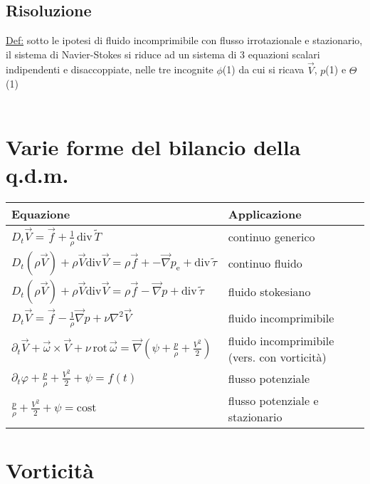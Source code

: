 \documentclass[11pt,a4paper]{report}
\begin{document}
	\section{Risoluzione}
	\underline{Def:} sotto le ipotesi di fluido incomprimibile con flusso irrotazionale e stazionario, il sistema di Navier-Stokes si riduce ad un sistema di 3 equazioni scalari indipendenti e disaccoppiate, nelle tre incognite $\phi$(1) da cui si ricava $\vec V$, $p$(1) e $\Theta$(1)\\\mbox{}\\

{\let\clearpage\relax \chapter{Varie forme del bilancio della q.d.m.}
	\begin{tabular}{@{}l|l}
	\quad Equazione&\quad Applicazione\\
	\hline
	$D_t\vec V=\vec f+\frac 1\rho\,\mathrm{div}\,\utilde T$&continuo generico\\
	$D_t(\rho\vec V)+\rho\vec V\mathrm{div}\vec V=\rho\vec f+-\vec\nabla p_\mathrm e+\mathrm{div}\,\utilde\tau$&continuo fluido\\
	$D_t(\rho\vec V)+\rho\vec V\mathrm{div}\vec V=\rho\vec f-\vec\nabla p+\mathrm{div}\,\utilde\tau$&fluido stokesiano\\
	$D_t\vec V=\vec f-\frac{1}{\rho}\vec\nabla p+\nu\nabla^2\vec V$&fluido incomprimibile\\
	$\partial_t\vec V+\vec\omega\times\vec V+\nu\,\mathrm{rot}\,\vec\omega=\vec\nabla(\psi+\frac p\rho+\frac{V^2}{2})$&fluido incomprimibile (vers. con vorticità)\\
	$\partial_t\varphi+\frac{p}{\rho}+\frac{V^2}{2}+\psi=f(t)$&flusso potenziale\\
	$\frac{p}{\rho}+\frac{V^2}{2}+\psi=\mathrm{cost}$&flusso potenziale e stazionario
	\end{tabular}}

	
\chapter{Vorticità}
\end{document}
